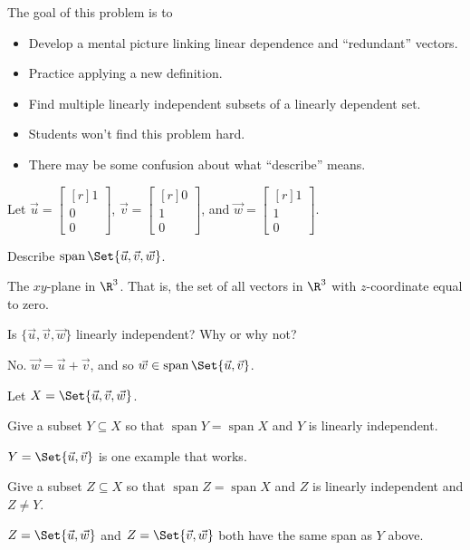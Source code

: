 \documentclass{problemset}
\DeclareMathOperator{\Span}{span}
\newcommand{\mat}[1]{\begin{bmatrix*}[r]#1\end{bmatrix*}}
\begin{document}
	\question
	\begin{annotation}
		\begin{goals}

			The goal of this problem is to
			\begin{itemize}
				\item Develop a mental picture linking linear dependence and
					``redundant'' vectors.
				\item Practice applying a new definition.
				\item Find multiple linearly independent subsets of a linearly dependent set.
			\end{itemize}
		\end{goals}

		\begin{notes}
			\begin{itemize}
				\item Students won't find this problem hard.
				\item There may be some confusion about what ``describe'' means.
			\end{itemize}
		\end{notes}
	\end{annotation}
		Let $\vec u=\mat{1\\0\\0}$, $\vec v=\mat{0\\1\\0}$, and $\vec w=\mat{1\\1\\0}$.
	\begin{parts}
		\item Describe $\Span\Set{\vec u,\vec v,\vec w}$.
			\begin{solution}
				The $xy$-plane in $\R^3$. That is, the set of all vectors in $\R^3$ with $z$-coordinate
				equal to zero.
			\end{solution}
		\item Is $\{\vec u,\vec v,\vec w\}$ linearly independent? Why or why not?
			\begin{solution}
				No. $\vec w=\vec u+\vec v$, and so $\vec w \in \Span\Set{\vec u, \vec v}$.
			\end{solution}
	\end{parts}

	Let $X=\Set{\vec u,\vec v,\vec w}$.

	\begin{parts}[resume]
		\item Give a subset $Y\subseteq X$ so that $\Span Y=\Span X$ and $Y$ is
			linearly independent.
			\begin{solution}
				$Y = \Set{\vec u,\vec v}$ is one example that works.
			\end{solution}
		\item Give a subset $Z\subseteq X$ so that $\Span Z=\Span X$ and $Z$ is
			linearly independent and $Z\neq Y$.
			\begin{solution}
				$Z = \Set{\vec u, \vec w}$ and $Z = \Set{\vec v, \vec w}$ both have
				the same span as $Y$ above.
			\end{solution}
	\end{parts}
\end{document}
